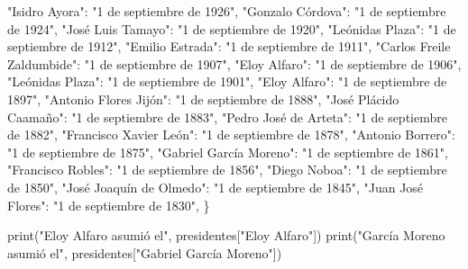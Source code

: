 \documentclass[
  a4paper,
  DIV=11,
  numbers=noendperiod,
  onepage,
  openany]{scrreprt}
\newenvironment{Shaded}{\begin{snugshade}}{\end{snugshade}}
\newcommand{\BuiltInTok}[1]{\textcolor[rgb]{0.00,0.23,0.31}{#1}}
\newcommand{\NormalTok}[1]{\textcolor[rgb]{0.00,0.23,0.31}{#1}}
\newcommand{\StringTok}[1]{\textcolor[rgb]{0.13,0.47,0.30}{#1}}
\begin{document}
\begin{Shaded}
\begin{Highlighting}[]
    \StringTok{"Isidro Ayora"}\NormalTok{: }\StringTok{"1 de septiembre de 1926"}\NormalTok{,}
    \StringTok{"Gonzalo Córdova"}\NormalTok{: }\StringTok{"1 de septiembre de 1924"}\NormalTok{,}
    \StringTok{"José Luis Tamayo"}\NormalTok{: }\StringTok{"1 de septiembre de 1920"}\NormalTok{,}
    \StringTok{"Leónidas Plaza"}\NormalTok{: }\StringTok{"1 de septiembre de 1912"}\NormalTok{,}
    \StringTok{"Emilio Estrada"}\NormalTok{: }\StringTok{"1 de septiembre de 1911"}\NormalTok{,}
    \StringTok{"Carlos Freile Zaldumbide"}\NormalTok{: }\StringTok{"1 de septiembre de 1907"}\NormalTok{,}
    \StringTok{"Eloy Alfaro"}\NormalTok{: }\StringTok{"1 de septiembre de 1906"}\NormalTok{,}
    \StringTok{"Leónidas Plaza"}\NormalTok{: }\StringTok{"1 de septiembre de 1901"}\NormalTok{,}
    \StringTok{"Eloy Alfaro"}\NormalTok{: }\StringTok{"1 de septiembre de 1897"}\NormalTok{,}
    \StringTok{"Antonio Flores Jijón"}\NormalTok{: }\StringTok{"1 de septiembre de 1888"}\NormalTok{,}
    \StringTok{"José Plácido Caamaño"}\NormalTok{: }\StringTok{"1 de septiembre de 1883"}\NormalTok{,}
    \StringTok{"Pedro José de Arteta"}\NormalTok{: }\StringTok{"1 de septiembre de 1882"}\NormalTok{,}
    \StringTok{"Francisco Xavier León"}\NormalTok{: }\StringTok{"1 de septiembre de 1878"}\NormalTok{,}
    \StringTok{"Antonio Borrero"}\NormalTok{: }\StringTok{"1 de septiembre de 1875"}\NormalTok{,}
    \StringTok{"Gabriel García Moreno"}\NormalTok{: }\StringTok{"1 de septiembre de 1861"}\NormalTok{,}
    \StringTok{"Francisco Robles"}\NormalTok{: }\StringTok{"1 de septiembre de 1856"}\NormalTok{,}
    \StringTok{"Diego Noboa"}\NormalTok{: }\StringTok{"1 de septiembre de 1850"}\NormalTok{,}
    \StringTok{"José Joaquín de Olmedo"}\NormalTok{: }\StringTok{"1 de septiembre de 1845"}\NormalTok{,}
    \StringTok{"Juan José Flores"}\NormalTok{: }\StringTok{"1 de septiembre de 1830"}\NormalTok{,}
\NormalTok{\}}

\BuiltInTok{print}\NormalTok{(}\StringTok{"Eloy Alfaro asumió el"}\NormalTok{, presidentes[}\StringTok{"Eloy Alfaro"}\NormalTok{])}
\BuiltInTok{print}\NormalTok{(}\StringTok{"García Moreno asumió el"}\NormalTok{, presidentes[}\StringTok{"Gabriel García Moreno"}\NormalTok{])}
\end{Highlighting}
\end{Shaded}
\end{document}
